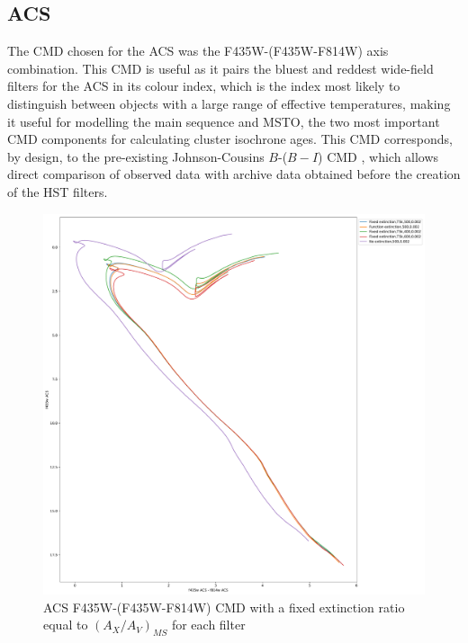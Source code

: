 \documentclass[12pt, a4paper]{report}
\begin{document}
\subsection{ACS} \label{ACS_isoc}
The CMD chosen for the ACS was the F435W-(F435W-F814W) axis combination. This CMD is useful as it pairs the bluest and reddest wide-field filters for the ACS in its colour index, which is the index most likely to distinguish between objects with a large range of effective temperatures, making it useful for modelling the main sequence and MSTO, the two most important CMD components for calculating cluster isochrone ages. This CMD corresponds, by design, to the pre-existing Johnson-Cousins $B$-($B-I$) CMD \citep{2005PASP..117.1049S}, which allows direct comparison of observed data with archive data obtained before the creation of the HST filters.

\begin{figure}[h]
\begin{center}
\includegraphics[width=1.0\textwidth]{../basti_isochrones_10_13Gyr/Extinction_T5k_FeH0fix_func_f435wACS_f435wACSmf814wACS_500_400_600_Myr_FeH_0p002_ref_noext_Av_1p0.pdf}
\caption{ACS F435W-(F435W-F814W) CMD with a fixed extinction ratio equal to $(A_{X}/A_{V})_{MS}$ for each filter}
\label{acs_isoc_T5k}
\end{center}
\end{figure}
\end{document}
